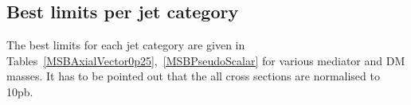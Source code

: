 \subsection{Best limits per jet category}

The best limits for each jet category are given in Tables~\ref{MSBAxialVector0p25},~\ref{MSBPseudoScalar} for various mediator and DM masses. It has to be pointed out that 
the all cross sections are normalised to 10pb.

\\





